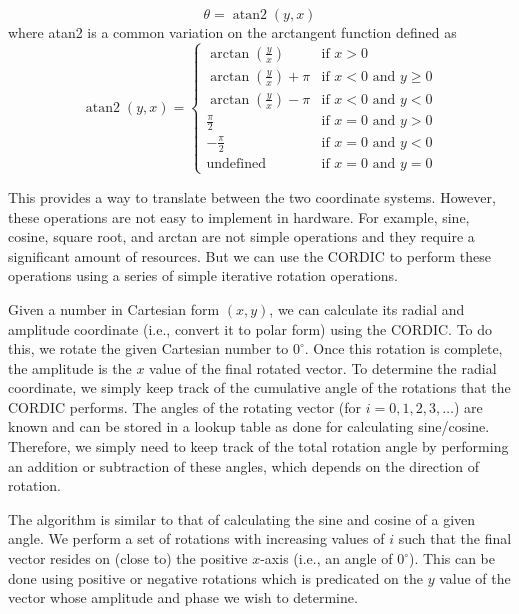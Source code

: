\begin{equation}
\theta = \operatorname{atan2}(y, x)
\end{equation}
where atan2 is a common variation on the arctangent function defined as
\begin{equation}
\operatorname{atan2}(y, x) =
\begin{cases}
\arctan(\frac{y}{x}) & \mbox{if } x > 0\\
\arctan(\frac{y}{x}) + \pi & \mbox{if } x < 0 \mbox{ and } y \ge 0\\
\arctan(\frac{y}{x}) - \pi & \mbox{if } x < 0 \mbox{ and } y < 0\\
\frac{\pi}{2} & \mbox{if } x = 0 \mbox{ and } y > 0\\
-\frac{\pi}{2} & \mbox{if } x = 0 \mbox{ and } y < 0\\
\text{undefined} & \mbox{if } x = 0 \mbox{ and } y = 0
\end{cases}
\end{equation}

This provides a way to translate between the two coordinate systems. However, these operations are not easy to implement in hardware. For example, sine, cosine, square root, and arctan are not simple operations and they require a significant amount of resources. But we can use the CORDIC to perform these operations using a series of simple iterative rotation operations. 

Given a number in Cartesian form $(x,y)$, we can calculate its radial and amplitude coordinate (i.e., convert it to polar form) using the CORDIC. To do this, we rotate the given Cartesian number to $0^{\circ}$. Once this rotation is complete, the amplitude is the $x$ value of the final rotated vector. To determine the radial coordinate, we simply keep track of the cumulative angle of the rotations that the CORDIC performs. The angles of the rotating vector (for $i = 0,1,2,3, \dots$) are known and can be stored in a lookup table as done for calculating sine/cosine. Therefore, we simply need to keep track of the total rotation angle by performing an addition or subtraction of these angles, which depends on the direction of rotation.

The algorithm is similar to that of calculating the sine and cosine of a given angle. We perform a set of rotations with increasing values of $i$ such that the final vector resides on (close to) the positive $x$-axis (i.e., an angle of $0^{\circ}$). This can be done using positive or negative rotations  which is predicated on the $y$ value of the vector whose amplitude and phase we wish to determine. 

